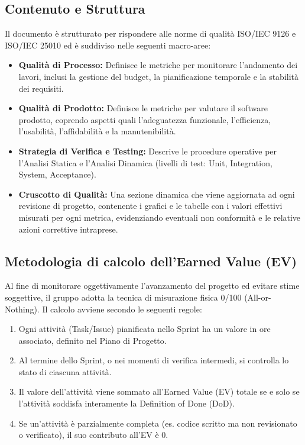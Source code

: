 \documentclass[11pt,a4paper]{article}
\begin{document}
\subsection{Contenuto e Struttura}
Il documento è strutturato per rispondere alle norme di qualità ISO/IEC 9126 e ISO/IEC 25010 ed è suddiviso nelle seguenti macro-aree:
\begin{itemize}
    \item \textbf{Qualità di Processo:} Definisce le metriche per monitorare l'andamento dei lavori, inclusi la gestione del budget, la pianificazione temporale e la stabilità dei requisiti.
    \item \textbf{Qualità di Prodotto:} Definisce le metriche per valutare il software prodotto, coprendo aspetti quali l'adeguatezza funzionale, l'efficienza, l'usabilità, l'affidabilità e la manutenibilità.
    \item \textbf{Strategia di Verifica e Testing:} Descrive le procedure operative per l'Analisi Statica e l'Analisi Dinamica (livelli di test: Unit, Integration, System, Acceptance).
    \item \textbf{Cruscotto di Qualità:} Una sezione dinamica che viene aggiornata ad ogni revisione di progetto, contenente i grafici e le tabelle con i valori effettivi misurati per ogni metrica, evidenziando eventuali non conformità e le relative azioni correttive intraprese.
\end{itemize}

\subsection{Metodologia di calcolo dell'Earned Value (EV)}
Al fine di monitorare oggettivamente l'avanzamento del progetto ed evitare stime soggettive, il gruppo adotta la tecnica di misurazione fisica 0/100 (All-or-Nothing).
Il calcolo avviene secondo le seguenti regole: 
\begin{enumerate} 
    \item Ogni attività (Task/Issue) pianificata nello Sprint ha un valore in ore associato, definito nel Piano di Progetto.
    \item Al termine dello Sprint, o nei momenti di verifica intermedi, si controlla lo stato di ciascuna attività. 
    \item Il valore dell'attività viene sommato all'Earned Value (EV) totale se e solo se l'attività soddisfa interamente la Definition of Done (DoD). \item Se un'attività è parzialmente completa (es. codice scritto ma non revisionato o verificato), il suo contributo all'EV è 0.
\end{enumerate} 
\end{document}
